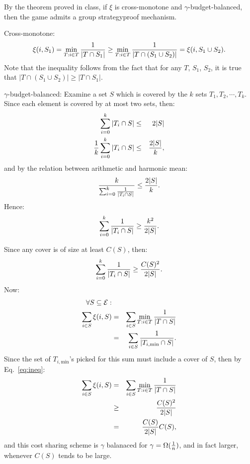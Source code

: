 \documentclass{article}
\begin{document}
By the theorem proved in class, if $\xi$ is cross-monotone and $\gamma$-budget-balanced, 
then the game admits a group strategyproof mechanism.

Cross-monotone:
\begin{equation}
  \xi(i,S_1)=\min_{T:i\in T}{1\over |T\cap S_1|}\geq
\min_{T:i\in T}{1\over |T\cap (S_1\cup S_2)|}=\xi(i,S_1\cup S_2).
\end{equation}
Note that the inequality follows from the fact that for any $T$, $S_1$, 
$S_2$, it is true that $|T\cap (S_1\cup S_2)|\geq|T\cap S_1|$.

$\gamma$-budget-balanced: Examine a set $S$ which is covered by the $k$ sets
 $T_1,T_2,\cdots,T_k$. Since each element is covered by at most two sets, then:
\begin{eqnarray}
  \sum_{i=0}^k{|T_i\cap S|}&\leq& 2|S|\\
  {1\over k}\sum_{i=0}^k{|T_i\cap S|}&\leq& {2|S|\over k},
\end{eqnarray}
and by the relation between arithmetic and harmonic mean:
\begin{equation}
  {k\over \sum_{i=0}^k{1\over |T_i\cap S|}}\leq {2|S|\over k}.
\end{equation}
Hence:
\begin{equation}
  \sum_{i=0}^k{1\over |T_i\cap S|}\geq {k^2\over 2|S|}.
\end{equation}

Since any cover is of size at least $C(S)$, then:
\begin{equation}
  \label{eq:ineq}
  \sum_{i=0}^k{1\over |T_i\cap S|}\geq {C(S)^2\over 2|S|}.  
\end{equation}
Now:
\begin{eqnarray*}
  \forall S\subseteq \mathcal{E}:\\
 \sum_{i\in S}{\xi(i, S)}
 &=&\sum_{i\in S}{\min_{T:i\in T}{1\over |T\cap S|}}\\
 &=&\sum_{i\in S}{1\over |T_{i,\mathrm{min}}\cap S|}.
\end{eqnarray*}
Since the set of $T_{i,\mathrm{min}}$'s picked for this sum must include a cover of
$S$, then by Eq.~\ref{eq:ineq}:
\begin{eqnarray}
 \sum_{i\in S}{\xi(i, S)}
 &=& \sum_{i\in S}{\min_{T:i\in T}{1\over |T\cap S|}}\\
 &\geq&{C(S)^2 \over 2|S|}\\
 &=&{C(S) \over 2|S|}C(S),
\end{eqnarray}
and this cost sharing scheme is $\gamma$ balanaced for 
$\gamma=\Omega({1\over n})$, and in fact larger, whenever $C(S)$ tends
to be large.
\end{document}

